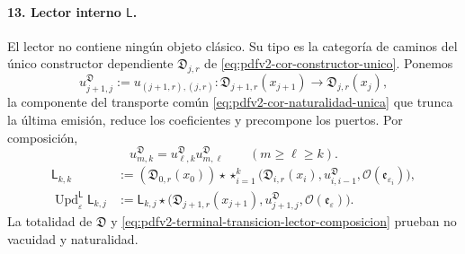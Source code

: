 \paragraph{13. Lector interno \(\mathsf L\).}
El lector no contiene ningún objeto clásico. Su tipo es la categoría de
caminos del único constructor dependiente
\(\mathfrak D_{j,r}\) de \eqref{eq:pdfv2-cor-constructor-unico}. Ponemos
\begin{equation}
\label{eq:pdfv2-terminal-transicion-lector-tipado}
 u^{\mathfrak D}_{j+1,j}
 :=u_{(j+1,r),(j,r)}:
 \mathfrak D_{j+1,r}(x_{j+1})
 \longrightarrow\mathfrak D_{j,r}(x_j),
\end{equation}
la componente del transporte común
\eqref{eq:pdfv2-cor-naturalidad-unica} que trunca la última emisión, reduce
los coeficientes y precompone los puertos. Por composición,
\begin{equation}
\label{eq:pdfv2-terminal-transicion-lector-composicion}
 u^{\mathfrak D}_{m,k}
 =u^{\mathfrak D}_{\ell,k}u^{\mathfrak D}_{m,\ell}
 \qquad(m\geq\ell\geq k).
\end{equation}
\begin{align}
 \mathsf L_{k,k}
 &:=(\mathfrak D_{0,r}(x_0))\star
 \mathop{\star}_{i=1}^{k}
 \bigl(\mathfrak D_{i,r}(x_i),u^{\mathfrak D}_{i,i-1},
       \mathcal O(\mathfrak e_{\varepsilon_i})\bigr),
 \label{eq:pdfv2-terminal-semilla-l}\\
 \operatorname{Upd}^{\mathsf L}_{\varepsilon}\mathsf L_{k,j}
 &:=
 \mathsf L_{k,j}\star
 \bigl(\mathfrak D_{j+1,r}(x_{j+1}),
 u^{\mathfrak D}_{j+1,j},\mathcal O(\mathfrak e_\varepsilon)\bigr).
 \label{eq:pdfv2-terminal-update-l}
\end{align}
La totalidad de \(\mathfrak D\) y
\eqref{eq:pdfv2-terminal-transicion-lector-composicion} prueban no vacuidad
y naturalidad.


